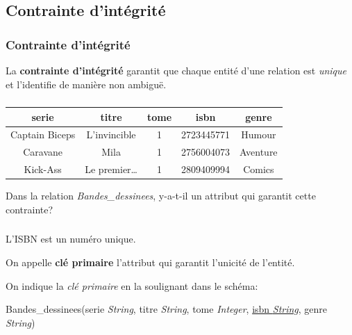 \documentclass[svgnames,11pt]{beamer}
\begin{document}
\subsection{Contrainte d'intégrité}
\begin{frame}
    \frametitle{Contrainte d'intégrité}

    \begin{aretenir}[]
        La \textbf{contrainte d'intégrité} garantit que chaque entité d'une relation est \emph{unique} et l'identifie de manière non ambiguë.
    \end{aretenir}

\end{frame}
\begin{frame}
    \frametitle{}

    \begin{center}
        \begin{tabular}{|*{5}{c|}}
            \hline
            serie          & titre           & tome & isbn       & genre    \\
            \hline
            Captain Biceps & L’invincible    & 1    & 2723445771 & Humour   \\
            Caravane       & Mila            & 1    & 2756004073 & Aventure \\
            Kick-Ass       & Le premier\dots & 1    & 2809409994 & Comics   \\
            \hline
        \end{tabular}
    \end{center}
    \begin{activite}
        Dans la relation \emph{Bandes\_dessinees}, y-a-t-il un attribut qui garantit cette contrainte?
    \end{activite}
\end{frame}
\begin{frame}
    \frametitle{}

    L'ISBN est un numéro unique.

    \begin{aretenir}[]
        On appelle \textbf{clé primaire} l'attribut qui garantit l'unicité de l'entité.
        \end{aretenir}
        On indique la \emph{clé primaire} en la soulignant dans le schéma:\\
\begin{center}
    Bandes\_dessinees(serie \emph{String}, titre \emph{String}, tome \emph{Integer}, \underline{isbn \emph{String}}, genre \emph{String})
\end{center}

\end{frame}
\end{document}

